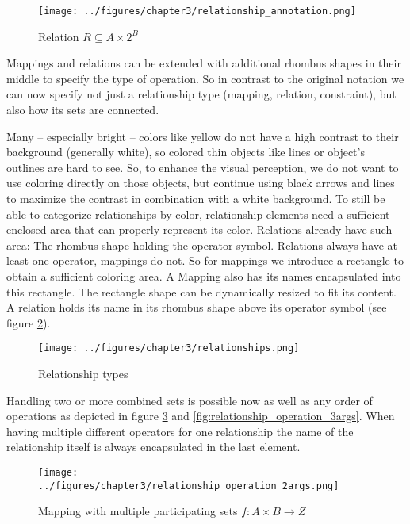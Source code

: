 \documentclass[twoside, openright, 12pt]{book}
\begin{document}
\begin{figure}[!htb]
	\centering
	\texttt{[image: ../figures/chapter3/relationship\_annotation.png]}
	\caption{Relation $R \subseteq A \times 2^B$}
	\label{fig:relationship_annotation}
\end{figure}

\noindent
Mappings and relations can be extended with additional rhombus shapes in their middle to specify the type of operation.
So in contrast to the original notation we can now specify not just a relationship type (mapping, relation, constraint), but also how its sets are connected.

Many -- especially bright -- colors like yellow do not have a high contrast to their background (generally white), so colored thin objects like lines or object's outlines are hard to see.
So, to enhance the visual perception, we do not want to use coloring directly on those objects, but continue using black arrows and lines to maximize the contrast in combination with a white background.
To still be able to categorize relationships by color, relationship elements need a sufficient enclosed area that can properly represent its color.
Relations already have such area: The rhombus shape holding the operator symbol.
Relations always have at least one operator, mappings do not.
So for mappings we introduce a rectangle to obtain a sufficient coloring area.
A Mapping also has its names encapsulated into this rectangle.
The rectangle shape can be dynamically resized to fit its content.
A relation holds its name in its rhombus shape above its operator symbol (see figure \ref{fig:relationships}).

\begin{figure}[htb]
	\centering
	\texttt{[image: ../figures/chapter3/relationships.png]}
	\caption{Relationship types}
	\label{fig:relationships}
\end{figure}

\noindent
Handling two or more combined sets is possible now as well as any order of operations as depicted in figure \ref{fig:relationship_operation_2args} and \ref{fig:relationship_operation_3args}.
When having multiple different operators for one relationship the name of the relationship itself is always encapsulated in the last element.

\begin{figure}[!htb]
	\centering
	\texttt{[image: ../figures/chapter3/relationship\_operation\_2args.png]}
	\caption{Mapping with multiple participating sets $f:A \times B \rightarrow Z$}
	\label{fig:relationship_operation_2args}
\end{figure}
\end{document}
